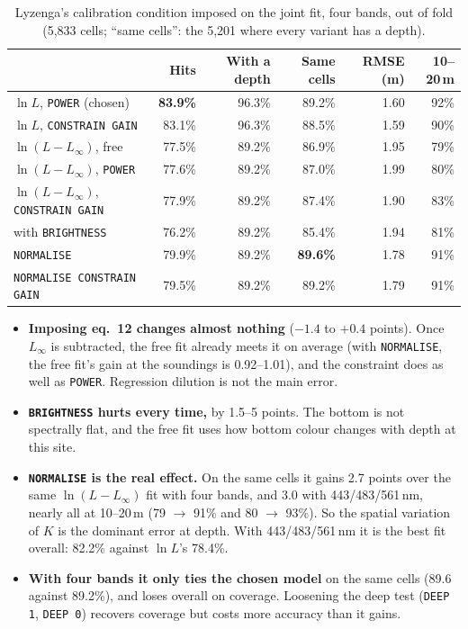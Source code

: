 \documentclass[11pt]{article}
\numberwithin{equation}{section}
\newcommand{\code}[1]{\texttt{#1}}
\begin{document}
\begin{table}[h]
\centering
\caption{Lyzenga's calibration condition imposed on the joint fit, four bands, out of fold
(5,833 cells; ``same cells'': the 5,201 where every variant has a depth).}
\label{tab:calib}
\begin{tabular}{lrrrrr}
\toprule
 & Hits & With a depth & Same cells & RMSE (m) & 10--20\,m \\
\midrule
$\ln L$, \code{POWER} (chosen)        & \textbf{83.9\%} & 96.3\% & 89.2\% & 1.60 & 92\% \\
$\ln L$, \code{CONSTRAIN GAIN}        & 83.1\% & 96.3\% & 88.5\% & 1.59 & 90\% \\
$\ln(L - L_{\infty})$, free               & 77.5\% & 89.2\% & 86.9\% & 1.95 & 79\% \\
$\ln(L - L_{\infty})$, \code{POWER}       & 77.6\% & 89.2\% & 87.0\% & 1.99 & 80\% \\
$\ln(L - L_{\infty})$, \code{CONSTRAIN GAIN} & 77.9\% & 89.2\% & 87.4\% & 1.90 & 83\% \\
\quad with \code{BRIGHTNESS}          & 76.2\% & 89.2\% & 85.4\% & 1.94 & 81\% \\
\code{NORMALISE}                      & 79.9\% & 89.2\% & \textbf{89.6\%} & 1.78 & 91\% \\
\code{NORMALISE CONSTRAIN GAIN}       & 79.5\% & 89.2\% & 89.2\% & 1.79 & 91\% \\
\bottomrule
\end{tabular}
\end{table}

\begin{itemize}
\item \textbf{Imposing eq.~12 changes almost nothing} ($-1.4$ to $+0.4$ points). Once $L_{\infty}$ is
  subtracted, the free fit already meets it on average (with \code{NORMALISE}, the free
  fit's gain at the soundings is 0.92--1.01), and the constraint does as well as \code{POWER}. Regression dilution is not the
  main error.
\item \textbf{\code{BRIGHTNESS} hurts every time,} by 1.5--5 points. The bottom is not spectrally
  flat, and the free fit uses how bottom colour changes with depth at this site.
\item \textbf{\code{NORMALISE} is the real effect.} On the same cells it gains 2.7 points over the
  same $\ln(L - L_{\infty})$ fit with four bands, and 3.0 with 443/483/561\,nm, nearly all at
  10--20\,m (79 $\to$ 91\% and 80 $\to$ 93\%). So the spatial variation of $K$ is the dominant
  error at depth. With 443/483/561\,nm it is the best fit overall: 82.2\% against $\ln L$'s
  78.4\%.
\item \textbf{With four bands it only ties the chosen model} on the same cells (89.6 against
  89.2\%), and loses overall on coverage. Loosening the deep test (\code{DEEP 1}, \code{DEEP 0})
  recovers coverage but costs more accuracy than it gains.
\end{itemize}
\end{document}
